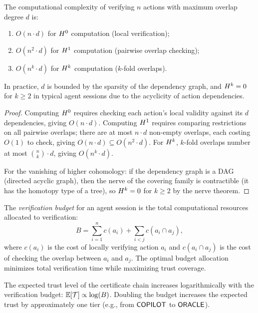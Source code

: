 \documentclass[11pt]{article}
\begin{document}
\begin{theorem}\label{thm:cohom-complexity}
The computational complexity of verifying $n$ actions with maximum
overlap degree $d$ is:
\begin{enumerate}[label=(\roman*)]
  \item $O(n \cdot d)$ for $H^{0}$ computation (local verification);
  \item $O(n^2 \cdot d)$ for $H^{1}$ computation (pairwise overlap
    checking);
  \item $O(n^k \cdot d)$ for $H^{k}$ computation ($k$-fold
    overlaps).
\end{enumerate}
In practice, $d$ is bounded by the sparsity of the dependency graph,
and $H^{k} = 0$ for $k \geq 2$ in typical agent sessions due to
the acyclicity of action dependencies.
\end{theorem}

\begin{proof}
Computing $H^{0}$ requires checking each action's local validity
against its $d$ dependencies, giving $O(n \cdot d)$.  Computing
$H^{1}$ requires comparing restrictions on all pairwise overlaps;
there are at most $n \cdot d$ non-empty overlaps, each costing $O(1)$
to check, giving $O(n \cdot d) \subseteq O(n^2 \cdot d)$.  For
$H^{k}$, $k$-fold overlaps number at most $\binom{n}{k} \cdot d$,
giving $O(n^k \cdot d)$.

For the vanishing of higher cohomology: if the dependency graph is
a DAG (directed acyclic graph), then the nerve of the covering family
is contractible (it has the homotopy type of a tree), so
$H^{k} = 0$ for $k \geq 2$ by the nerve theorem.
\end{proof}

\begin{definition}\label{def:verif-budget}
The \emph{verification budget} for an agent session is the total
computational resources allocated to verification:
\[
  B = \sum_{i=1}^{n} c(a_i) + \sum_{i < j} c(a_i \cap a_j),
\]
where $c(a_i)$ is the cost of locally verifying action $a_i$ and
$c(a_i \cap a_j)$ is the cost of checking the overlap between
$a_i$ and $a_j$.  The optimal budget allocation minimizes total
verification time while maximizing trust coverage.
\end{definition}

\begin{proposition}\label{prop:budget-trust}
The expected trust level of the certificate chain increases
logarithmically with the verification budget: $\mathbb{E}[\mathcal{T}]
\propto \log(B)$.  Doubling the budget increases the expected trust
by approximately one tier (e.g., from $\mathsf{COPILOT}$ to $\mathsf{ORACLE}$).
\end{proposition}
\end{document}
